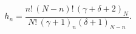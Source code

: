 \[h_{n}=\frac{n!\,(N-n)!\,\left(\gamma+\delta+2\right)_{N}}{N!\,\left(\gamma+1%
\right)_{n}\left(\delta+1\right)_{N-n}}.\]